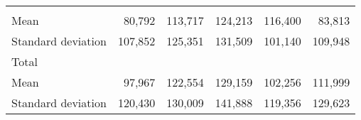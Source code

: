 \begin{tabular}{llllll}
  \multicolumn{1}{|r}{} &
  \multicolumn{1}{r}{} &
  \multicolumn{1}{r}{} &
  \multicolumn{1}{r}{} &
  \multicolumn{1}{r}{} \\
\multicolumn{1}{l}{\hspace{4em}Mean} &
  \multicolumn{1}{|r}{80,792} &
  \multicolumn{1}{r}{113,717} &
  \multicolumn{1}{r}{124,213} &
  \multicolumn{1}{r}{116,400} &
  \multicolumn{1}{r}{83,813} \\
\multicolumn{1}{l}{\hspace{4em}Standard deviation} &
  \multicolumn{1}{|r}{107,852} &
  \multicolumn{1}{r}{125,351} &
  \multicolumn{1}{r}{131,509} &
  \multicolumn{1}{r}{101,140} &
  \multicolumn{1}{r}{109,948} \\
\multicolumn{1}{l}{\hspace{3em}Total} &
  \multicolumn{1}{|r}{} &
  \multicolumn{1}{r}{} &
  \multicolumn{1}{r}{} &
  \multicolumn{1}{r}{} &
  \multicolumn{1}{r}{} \\
\multicolumn{1}{l}{\hspace{4em}Mean} &
  \multicolumn{1}{|r}{97,967} &
  \multicolumn{1}{r}{122,554} &
  \multicolumn{1}{r}{129,159} &
  \multicolumn{1}{r}{102,256} &
  \multicolumn{1}{r}{111,999} \\
\multicolumn{1}{l}{\hspace{4em}Standard deviation} &
  \multicolumn{1}{|r}{120,430} &
  \multicolumn{1}{r}{130,009} &
  \multicolumn{1}{r}{141,888} &
  \multicolumn{1}{r}{119,356} &
  \multicolumn{1}{r}{129,623} \\
\cline{1-6}
\end{tabular}
